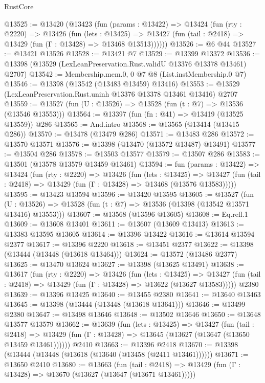 \begin{lexlean}{RustCore}
\begin{coremodule}
@13525 := @13420
    (@13423
      (fun (params : @13422) =>
      @13424
        (fun (rty : @2220) =>
        @13426
          (fun (lets : @13425) =>
          @13427 (fun (tail : @2418) => @13429 (fun (Γ : @13428) => @13468 @13513))))))
@13526 := @6 @44
@13527 := @13421 @13526
@13528 := @13421 @7
@13529 := @13399 @13372
@13536 := @13398 (@13529 (LexLeanPreservation.Rust.validU @13376 @13378 @13461) @2707)
@13542 := Membership.mem.{0, 0} @7 @8 (List.instMembership.{0} @7)
@13546 := @13398 (@13542 (@13483 @13459) @13416)
@13553 := @13529 (LexLeanPreservation.Rust.uninh @13376 @13378 @13461 @13416) @2707
@13559 := @13527 (fun (U : @13526) => @13528 (fun (t : @7) => @13536 (@13546 @13553)))
@13564 := @13397 (fun (fn : @41) => @13419 (@13525 @13559)) @286
@13565 := And.intro
@13568 := @13565 (@13414 (@13415 @286))
@13570 := @13478 (@13479 @286)
@13571 := @13483 @286
@13572 := @13570 @13571
@13576 := @13398 (@13470 (@13572 @13487) @13491)
@13577 := @13504 @286
@13578 := @13503 @13577
@13579 := @13507 @286
@13583 := @13501 (@13578 @13579 @13459 @13461)
@13594 := fun (params : @13422) =>
  @13424
    (fun (rty : @2220) =>
    @13426
      (fun (lets : @13425) =>
      @13427 (fun (tail : @2418) => @13429 (fun (Γ : @13428) => @13468 (@13576 @13583)))))
@13595 := @13423 @13594
@13596 := @13420 @13595
@13605 := @13527
    (fun (U : @13526) => @13528 (fun (t : @7) => @13536 (@13398 (@13542 @13571 @13416) @13553)))
@13607 := @13568 (@13596 @13605)
@13608 := Eq.refl.{1}
@13609 := @13608 @13401
@13611 := @13607 (@13609 @13413)
@13613 := @13383 @13595 @13605
@13614 := @13396 @13422
@13616 := @13614 @13594 @2377
@13617 := @13396 @2220
@13618 := @13451 @2377
@13622 := @13398 (@13444 (@13448 (@13618 @13464)))
@13624 := @13572 (@13486 @2377)
@13625 := @13470 @13624
@13627 := @13398 (@13625 @13491)
@13638 := @13617
    (fun (rty : @2220) =>
    @13426
      (fun (lets : @13425) =>
      @13427 (fun (tail : @2418) => @13429 (fun (Γ : @13428) => @13622 (@13627 @13583)))))
    @2380
@13639 := @13396 @13425
@13640 := @13455 @2380
@13641 := @13640 @13463
@13645 := @13398 (@13444 (@13448 (@13618 @13641)))
@13646 := @13499 @2380
@13647 := @13498 @13646
@13648 := @13502 @13646
@13650 := @13648 @13577 @13579
@13662 := @13639
    (fun (lets : @13425) =>
    @13427
      (fun (tail : @2418) =>
      @13429 (fun (Γ : @13428) => @13645 (@13627 (@13647 (@13650 @13459 @13461))))))
    @2410
@13663 := @13396 @2418
@13670 := @13398 (@13444 (@13448 (@13618 (@13640 (@13458 (@2411 @13461))))))
@13671 := @13650 @2410
@13680 := @13663
    (fun (tail : @2418) => @13429 (fun (Γ : @13428) => @13670 (@13627 (@13647 (@13671 @13461)))))

\end{coremodule}
\end{lexlean}
